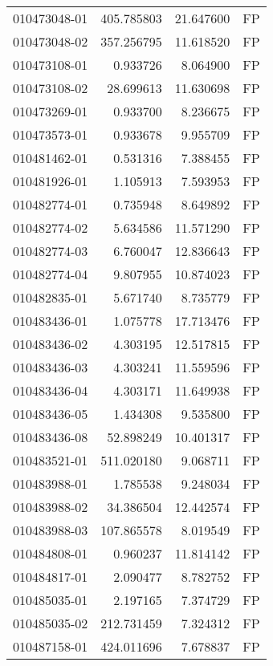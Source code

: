 \begin{tabular}{lrrl}
010473048-01 &  405.785803 &      21.647600 &   FP \\
010473048-02 &  357.256795 &      11.618520 &   FP \\
010473108-01 &    0.933726 &       8.064900 &   FP \\
010473108-02 &   28.699613 &      11.630698 &   FP \\
010473269-01 &    0.933700 &       8.236675 &   FP \\
010473573-01 &    0.933678 &       9.955709 &   FP \\
010481462-01 &    0.531316 &       7.388455 &   FP \\
010481926-01 &    1.105913 &       7.593953 &   FP \\
010482774-01 &    0.735948 &       8.649892 &   FP \\
010482774-02 &    5.634586 &      11.571290 &   FP \\
010482774-03 &    6.760047 &      12.836643 &   FP \\
010482774-04 &    9.807955 &      10.874023 &   FP \\
010482835-01 &    5.671740 &       8.735779 &   FP \\
010483436-01 &    1.075778 &      17.713476 &   FP \\
010483436-02 &    4.303195 &      12.517815 &   FP \\
010483436-03 &    4.303241 &      11.559596 &   FP \\
010483436-04 &    4.303171 &      11.649938 &   FP \\
010483436-05 &    1.434308 &       9.535800 &   FP \\
010483436-08 &   52.898249 &      10.401317 &   FP \\
010483521-01 &  511.020180 &       9.068711 &   FP \\
010483988-01 &    1.785538 &       9.248034 &   FP \\
010483988-02 &   34.386504 &      12.442574 &   FP \\
010483988-03 &  107.865578 &       8.019549 &   FP \\
010484808-01 &    0.960237 &      11.814142 &   FP \\
010484817-01 &    2.090477 &       8.782752 &   FP \\
010485035-01 &    2.197165 &       7.374729 &   FP \\
010485035-02 &  212.731459 &       7.324312 &   FP \\
010487158-01 &  424.011696 &       7.678837 &   FP \\

\end{tabular}
